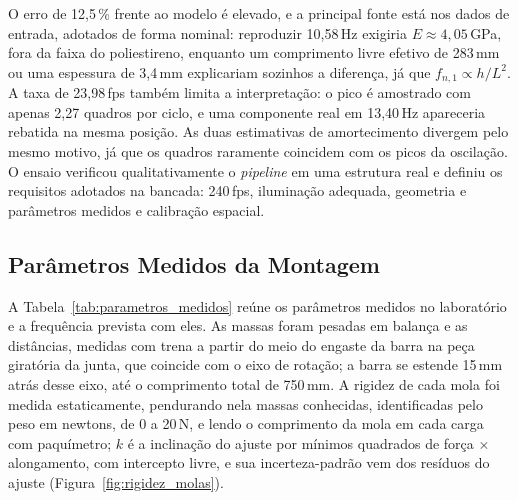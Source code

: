 \documentclass[a4paper,10pt,twocolumn]{article}
\begin{document}
O erro de 12,5\,\% frente ao modelo é elevado, e a principal fonte está nos dados de entrada, adotados de forma nominal: reproduzir 10,58\,Hz exigiria $E \approx 4{,}05$\,GPa, fora da faixa do poliestireno, enquanto um comprimento livre efetivo de 283\,mm ou uma espessura de 3,4\,mm explicariam sozinhos a diferença, já que $f_{n,1} \propto h/L^2$. A taxa de 23,98\,fps também limita a interpretação: o pico é amostrado com apenas 2,27 quadros por ciclo, e uma componente real em 13,40\,Hz apareceria rebatida na mesma posição. As duas estimativas de amortecimento divergem pelo mesmo motivo, já que os quadros raramente coincidem com os picos da oscilação. O ensaio verificou qualitativamente o \textit{pipeline} em uma estrutura real e definiu os requisitos adotados na bancada: 240\,fps, iluminação adequada, geometria e parâmetros medidos e calibração espacial.

\subsection{Parâmetros Medidos da Montagem}
\label{sec:res_parametros}

A Tabela~\ref{tab:parametros_medidos} reúne os parâmetros medidos no laboratório e a frequência prevista com eles. As massas foram pesadas em balança e as distâncias, medidas com trena a partir do meio do engaste da barra na peça giratória da junta, que coincide com o eixo de rotação; a barra se estende 15\,mm atrás desse eixo, até o comprimento total de 750\,mm. A rigidez de cada mola foi medida estaticamente, pendurando nela massas conhecidas, identificadas pelo peso em newtons, de 0 a 20\,N, e lendo o comprimento da mola em cada carga com paquímetro; $k$ é a inclinação do ajuste por mínimos quadrados de força $\times$ alongamento, com intercepto livre, e sua incerteza-padrão vem dos resíduos do ajuste (Figura~\ref{fig:rigidez_molas}).
\end{document}
